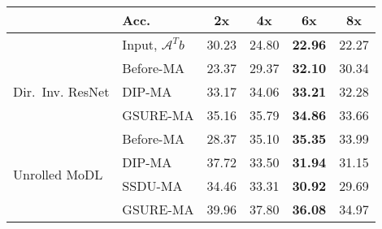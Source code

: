\centering
	\begin{tabular}{l|l|cccc} \toprule
		&Acc.                                      & 2x    &  4x  &  \textbf{6x}   &  8x   \\ \midrule
&Input, $\mathcal A^T b$	               & 30.23 & 24.80 & \textbf{22.96}& 22.27 \\ \midrule
   \multirow{3}{1.22cm}{Dir.~Inv. ResNet}&Before-MA & 23.37 & 29.37 & \textbf{32.10}& 30.34 \\
		&DIP-MA	                                   & 33.17 & 34.06 & \textbf{33.21}& 32.28 \\
		&GSURE-MA                                  & 35.16 & 35.79 & \textbf{34.86}& 33.66 \\ \midrule 
	\multirow{4}{1.22cm}{Unrolled MoDL}	&Before-MA & 28.37 & 35.10 & \textbf{35.35}& 33.99 \\
		&DIP-MA	                                   & 37.72 & 33.50 & \textbf{31.94}& 31.15 \\
    	&SSDU-MA	                               & 34.46 & 33.31 & \textbf{30.92} & 29.69 \\
		&GSURE-MA                                  & 39.96 & 37.80 & \textbf{36.08} & 34.97 \\ \bottomrule		 
	\end{tabular}
